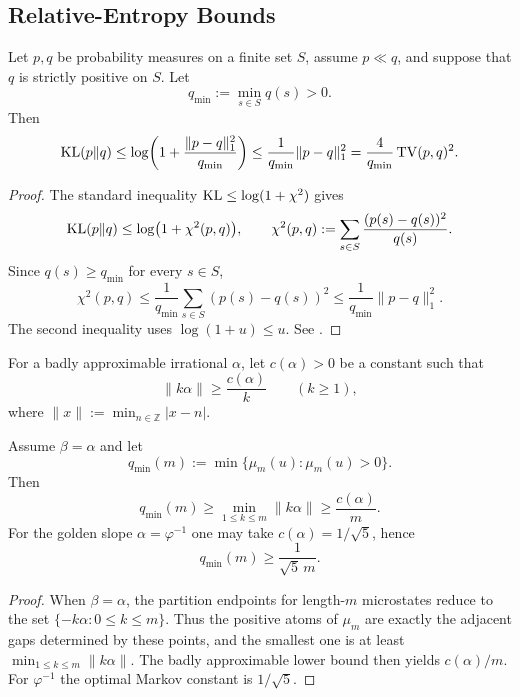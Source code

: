 \subsection{Relative-Entropy Bounds}

\begin{lemma}\label{lem:kl-from-tv-qmin}
Let $p,q$ be probability measures on a finite set $S$, assume $p\ll q$, and
suppose that $q$ is strictly positive on $S$. Let
\[
q_{\min}:=\min_{s\in S}q(s)>0.
\]
Then
\[
\operatorname{KL}(p\|q)
\le
\log\!\left(1+\frac{\|p-q\|_1^2}{q_{\min}}\right)
\le
\frac{1}{q_{\min}}\|p-q\|_1^2
=
\frac{4}{q_{\min}}\operatorname{TV}(p,q)^2.
\]
\end{lemma}

\begin{proof}
The standard inequality \(\operatorname{KL}\le \log(1+\chi^2)\) gives
\[
\operatorname{KL}(p\|q)\le \log\bigl(1+\chi^2(p,q)\bigr),
\qquad
\chi^2(p,q):=\sum_{s\in S}\frac{(p(s)-q(s))^2}{q(s)}.
\]
Since \(q(s)\ge q_{\min}\) for every \(s\in S\),
\[
\chi^2(p,q)
\le
\frac{1}{q_{\min}}\sum_{s\in S}(p(s)-q(s))^2
\le
\frac{1}{q_{\min}}\|p-q\|_1^2.
\]
The second inequality uses \(\log(1+u)\le u\). See
\cite{SasonVerdu2016fDivergence}.
\end{proof}

\begin{definition}
For a badly approximable irrational $\alpha$, let $c(\alpha)>0$ be a constant
such that
\[
\|k\alpha\|\ge \frac{c(\alpha)}{k}\qquad (k\ge 1),
\]
where $\|x\|:=\min_{n\in\mathbb{Z}}|x-n|$.
\end{definition}

\begin{proposition}\label{prop:qmin-lowerbound-markov}
Assume $\beta=\alpha$ and let
\[
q_{\min}(m):=\min\{\mu_m(u):\mu_m(u)>0\}.
\]
Then
\[
q_{\min}(m)\ge \min_{1\le k\le m}\|k\alpha\|\ge \frac{c(\alpha)}{m}.
\]
For the golden slope $\alpha=\varphi^{-1}$ one may take
$c(\alpha)=1/\sqrt5$, hence
\[
q_{\min}(m)\ge \frac{1}{\sqrt5\,m}.
\]
\end{proposition}

\begin{proof}
When $\beta=\alpha$, the partition endpoints for length-$m$ microstates reduce
to the set $\{-k\alpha:0\le k\le m\}$.  Thus the positive atoms of $\mu_m$ are
exactly the adjacent gaps determined by these points, and the smallest one is
at least $\min_{1\le k\le m}\|k\alpha\|$.  The badly approximable lower bound
then yields $c(\alpha)/m$.  For $\varphi^{-1}$ the optimal Markov constant is
$1/\sqrt5$.
\end{proof}

